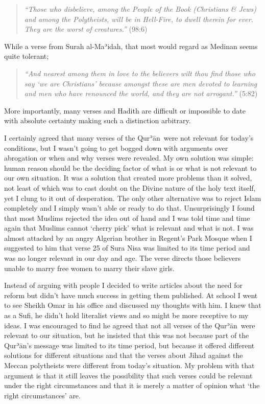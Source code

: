 \documentclass[12pt]{memoir}
\def\´{ʾ} %
\newcommand{\cor}[2]{#2} %
\def \Quran{Qur\-\´ān} %
\newcommand{\QRef}[1]{{\color{darkblue}#1}}
\begin{document}
\begin{quote}
\emph{“Those who disbelieve, among the People of the Book (Christians \& Jews)
and among the Polytheists, will be in Hell-Fire, to dwell therein for ever.
They are the worst of creatures.”}
(\QRef{98:6})
\end{quote}

While a verse from Surah al-Ma\´idah, that most would regard
as Medinan seems quite tolerant;

\begin{quote}
\emph{“And nearest among them in love to the believers wilt thou find those
who say ‘we are Christians’ because amongst these are men devoted to learning
and men who have renounced the world, and they are not arrogant.”}
(\QRef{5:82})
\end{quote}

More importantly, many verses and Hadith are difficult or impossible
to date with absolute certainty making such a distinction arbitrary.

I certainly agreed that many verses of the \Quran\ were not relevant
for today’s conditions, but I wasn’t going to get bogged down
with arguments over abrogation or when and why verses were revealed.
My own solution was simple:
human reason should be the deciding factor of what is
or what is not relevant to our own situation.
It was a solution that created more problems than it solved,
not least of which was to cast doubt on the Divine nature
of the holy text itself, yet \cor{it}{} I clung to it out of desperation.
The only other alternative was to reject Islam completely
and I simply wasn’t able or ready to do that.
Unsurprisingly I found that most Muslims rejected the idea out of hand
and I was told time and time again that Muslims
cannot ‘cherry pick’ what is relevant and what is not.
I was almost attacked by an angry Algerian brother in Regent’s Park Mosque
when I suggested to him that verse 25 of Sura Nisa was limited
to it\cor{’}{}s time period and was no\cor{-}{ }longer
relevant in our day and age.
The verse directs those believers unable to marry free women
to marry their slave girls.

Instead of arguing with people I decided to write articles about the need
for reform but didn’t have much success in getting them published.
At school I went to see Sheikh Omar in his office
and discussed my thoughts with him.
I knew that as a Sufi, he didn’t hold literalist views
and so might be more receptive to my ideas.
I was encouraged to find he agreed that not all verses of the \Quran\
were relevant to our situation, but he insisted that this
was not because part of the \Quran’s message was limited to its time period,
but because it offered different solutions for different situations
and that the verses about Jihad against the Meccan polytheists
were different from today’s situation.
My problem with that argument is that it still leaves the possibility
that such verses could be relevant under the right circumstances
and that it is merely a matter of opinion what ‘the right circumstances’ are.
\end{document}
